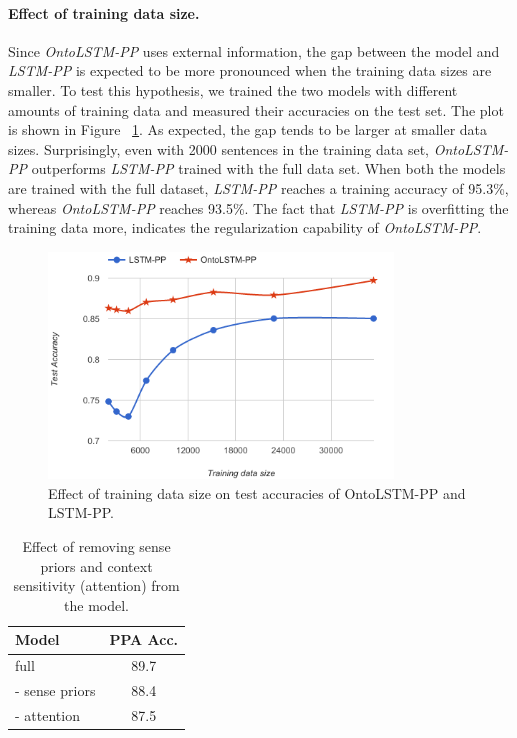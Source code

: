 \paragraph{Effect of training data size.}
Since \textit{OntoLSTM-PP} uses external information, the gap between the model and \textit{LSTM-PP} is expected to be more pronounced when the training data sizes are smaller. To test this hypothesis, we trained the two models with different amounts of training data and measured their accuracies on the test set. The plot is shown in Figure ~\ref{fig:ontolstm_pp_data_size_variation}. As expected, the gap tends to be larger at smaller data sizes. Surprisingly, even with 2000 sentences in the training data set, \textit{OntoLSTM-PP} outperforms \textit{LSTM-PP} trained with the full data set. 
When both the models are trained with the full dataset, \textit{LSTM-PP} reaches a training accuracy of 95.3\%, whereas \textit{OntoLSTM-PP} reaches 93.5\%. The fact that \textit{LSTM-PP} is overfitting the training data more, indicates the regularization capability of \textit{OntoLSTM-PP}.
\begin{figure}
\begin{center}
\includegraphics[width=3.6in]{figures/training_data_size.png}
\caption{Effect of training data size on test accuracies of OntoLSTM-PP and LSTM-PP.}
\label{fig:ontolstm_pp_data_size_variation}
\end{center}
\end{figure}

\begin{table}
    \centering
    \begin{tabular}{|l|c|}
    \hline
    \textbf{Model}	& \textbf{PPA Acc.}\\
    \hline
    full		& 89.7 \\
    - sense priors	& 88.4 \\
    - attention		& 87.5 \\
    \hline
    \end{tabular}
    \caption{Effect of removing sense priors and context sensitivity (attention) from the model.}
    \label{tab:ontolstm_pp_ablation_results}
\end{table}

